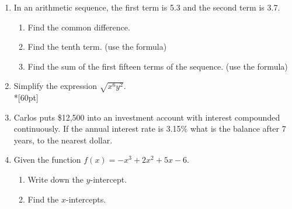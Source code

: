 \documentclass[12pt, oneside]{article}
\begin{document}
\begin{enumerate}


\item In an arithmetic sequence, the first term is 5.3 and the second term is 3.7.
\begin{enumerate}
    \item Find the common difference.
        \begin{flushright}[2]\end{flushright}
    \item Find the tenth term. (use the formula)\\[50pt]
        \begin{flushright}[2]\end{flushright}
    \item Find the sum of the first fifteen terms of the sequence. (use the formula)\\[50pt]
        \begin{flushright}[2]\end{flushright}
\end{enumerate}

\item Simplify the expression $\sqrt{x^6 y^2}$.\\*[60pt]
        \begin{flushright}[2]\end{flushright}

\item Carlos puts \$12,500 into an investment account with interest compounded continuously. If the annual interest rate is 3.15\% what is the balance after 7 years, to the nearest dollar. %
        \begin{flushright}[5]\end{flushright}

\newpage
\item Given the function $f(x)=-x^3+2x^2+5x-6$.
  \begin{enumerate}
      \item Write down the $y$-intercept.
          \begin{flushright}[1]\end{flushright}%
      \item Find the $x$-intercepts.%
          \begin{flushright}[2]\end{flushright}


\end{enumerate}
\end{enumerate}
\end{document}
